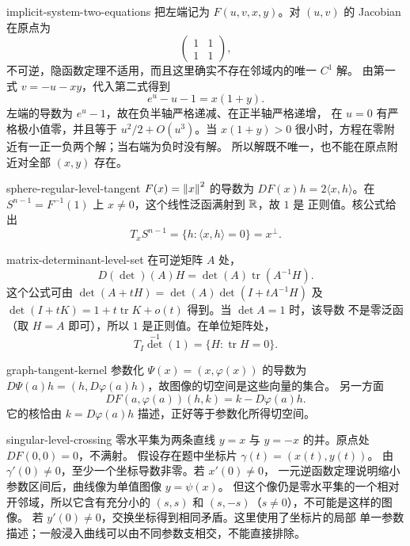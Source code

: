 \begin{solution}{implicit-system-two-equations}
把左端记为 $F(u,v,x,y)$。对 $(u,v)$ 的 Jacobian 在原点为
\[
 \begin{pmatrix}1&1\\1&1\end{pmatrix},
\]
不可逆，隐函数定理不适用，而且这里确实不存在邻域内的唯一 $C^1$ 解。
由第一式 $v=-u-xy$，代入第二式得到
\[
 e^u-u-1=x(1+y).
\]
左端的导数为 \(e^u-1\)，故在负半轴严格递减、在正半轴严格递增，
在 $u=0$ 有严格极小值零，并且等于 $u^2/2+O(u^3)$。当
$x(1+y)>0$ 很小时，方程在零附近有一正一负两个解；当右端为负时没有解。
所以解既不唯一，也不能在原点附近对全部 $(x,y)$ 存在。
\end{solution}

\begin{solution}{sphere-regular-level-tangent}
$F(x)=\left\lVert x\right\rVert^2$ 的导数为 $DF(x)h=2\langle x,h\rangle$。在
$S^{n-1}=F^{-1}(1)$ 上 $x\ne0$，这个线性泛函满射到 $\mathbb{R}$，故 $1$ 是
正则值。核公式给出
\[
 T_xS^{n-1}=\{h:\langle x,h\rangle=0\}=x^\perp.
\]
\end{solution}

\begin{solution}{matrix-determinant-level-set}
在可逆矩阵 $A$ 处，
\[
 D(\det)(A)H=\det(A)\operatorname{tr}(A^{-1}H).
\]
这个公式可由
$\det(A+tH)=\det(A)\det(I+tA^{-1}H)$ 及
$\det(I+tK)=1+t\operatorname{tr}K+o(t)$ 得到。当 $\det A=1$ 时，该导数
不是零泛函（取 $H=A$ 即可），所以 $1$ 是正则值。在单位矩阵处，
\[
 T_I\det^{-1}(1)=\{H:\operatorname{tr}H=0\}.
\]
\end{solution}

\begin{solution}{graph-tangent-kernel}
参数化 $\Psi(x)=(x,\varphi(x))$ 的导数为
$D\Psi(a)h=(h,D\varphi(a)h)$，故图像的切空间是这些向量的集合。
另一方面
\[
 DF(a,\varphi(a))(h,k)=k-D\varphi(a)h.
\]
它的核恰由 $k=D\varphi(a)h$ 描述，正好等于参数化所得切空间。
\end{solution}

\begin{solution}{singular-level-crossing}
零水平集为两条直线 $y=x$ 与 $y=-x$ 的并。原点处 $DF(0,0)=0$，不满射。
假设存在题中坐标片 \(\gamma(t)=(x(t),y(t))\)。
由 \(\gamma'(0)\ne0\)，至少一个坐标导数非零。若 \(x'(0)\ne0\)，
一元逆函数定理说明缩小参数区间后，曲线像为单值图像 \(y=\psi(x)\)。
但这个像仍是零水平集的一个相对开邻域，所以它含有充分小的
\((s,s)\) 和 \((s,-s)\)（\(s\ne0\)），不可能是这样的图像。
若 \(y'(0)\ne0\)，交换坐标得到相同矛盾。这里使用了坐标片的局部
单一参数描述；一般浸入曲线可以由不同参数支相交，不能直接排除。
\end{solution}

